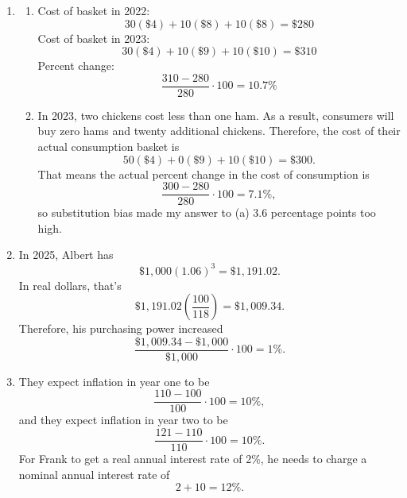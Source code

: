 \documentclass{article}
\begin{document}
\begin{enumerate}
	The median family's purchasing power increases in every decade.
	
\item

	\begin{enumerate}
	
	\item
		Cost of basket in 2022:
		\begin{equation*}
		30(\$4) + 10(\$8) + 10(\$8) = \$280
		\end{equation*}
		Cost of basket in 2023:
		\begin{equation*}
		30(\$4) + 10(\$9) + 10(\$10) = \$310
		\end{equation*}
		Percent change:
		\begin{equation*}
		\frac{310 - 280}{280} \cdot 100 = 10.7\%
		\end{equation*}
		
	\item In 2023, two chickens cost less than one ham. As a result, consumers will buy zero hams and twenty additional chickens. Therefore, the cost of their actual consumption basket is
	\begin{equation*}
	50(\$4) + 0(\$9) + 10(\$10) = \$300.
	\end{equation*}
	That means the actual percent change in the cost of consumption is
	\begin{equation*}
	\frac{300 - 280}{280} \cdot 100 = 7.1\%,
	\end{equation*}
	so substitution bias made my answer to (a) 3.6 percentage points too high.
	
	\end{enumerate}
	
\item In 2025, Albert has
	\begin{equation*}
	\$1,000(1.06)^3 = \$1,191.02.
	\end{equation*}
	In real dollars, that's
	\begin{equation*}
	\$1,191.02 \left( \frac{100}{118} \right) = \$1,009.34.
	\end{equation*}
	Therefore, his purchasing power increased
	\begin{equation*}
	\frac{\$1,009.34 - \$1,000}{\$1,000} \cdot 100 = 1\%.
	\end{equation*}
	
\item They expect inflation in year one to be
	\begin{equation*}
	\frac{110 - 100}{100} \cdot 100 = 10\%,
	\end{equation*}
	and they expect inflation in year two to be
	\begin{equation*}
	\frac{121 - 110}{110} \cdot 100 = 10\%.
	\end{equation*}
	For Frank to get a real annual interest rate of 2\%, he needs to charge a nominal annual interest rate of
	\begin{equation*}
	2 + 10 = 12\%.
	\end{equation*}
	

\end{enumerate}
\end{document}
